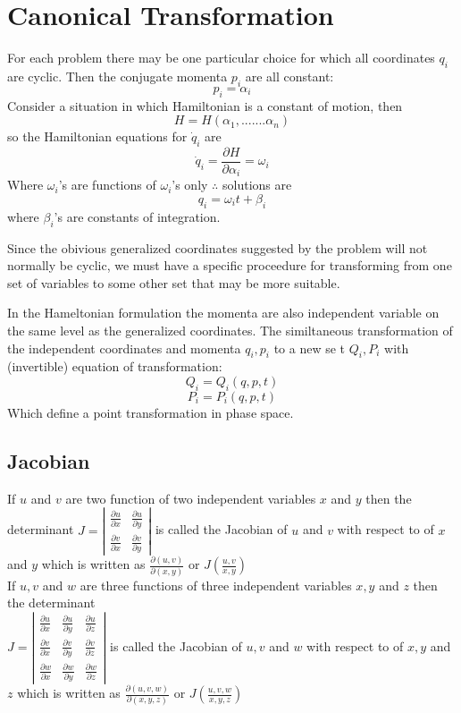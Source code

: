 \chapter{Canonical Transformation}
For each problem there may be one particular choice for which all coordinates $q_i$ are cyclic. Then the conjugate momenta $p_i$ are all constant:
$$p_i=\alpha_i$$
Consider a situation in which Hamiltonian is a constant of motion,
then 
$$H=H(\alpha_1,.......\alpha_n)$$
so the Hamiltonian equations for $\dot{q}_i$ are 
$$\dot{q}_i=\frac{\partial H}{\partial \alpha_i}=\omega_i$$
Where $\omega_i$'s are functions of $\omega_i$'s only 
$\therefore $ solutions are
$$ q_i=\omega_i t+\beta_i$$
where $\beta_i$'s are constants of integration.\\
\par Since the obivious generalized coordinates suggested by the problem will
not normally be cyclic, we must have a specific proceedure for transforming from one set of variables to some other set that may be more suitable.\\
\par In the Hameltonian formulation the momenta are also independent variable on the same level as the generalized coordinates. The similtaneous transformation of the independent coordinates and momenta $q_i,p_i$ to a new se t  $Q_i,P_i$ with (invertible) equation of transformation:
$$Q_i=Q_i (q,p,t)$$
$$P_i=P_i (q,p,t)$$
Which define a point transformation in phase space.
\section{Jacobian}
If $u$ and $v$ are two function of two independent variables $x$ and $y$ then the determinant $J=\left|\begin{array}{ll}\frac{\partial u}{\partial x} & \frac{\partial u}{\partial y} \\ \frac{\partial v}{\partial x} & \frac{\partial v}{\partial y}\end{array}\right|$ is called the Jacobian of $u$ and $v$ with respect to of $x$ and $y$ which is written as $\frac{\partial(u, v)}{\partial(x, y)}$ or $J\left(\frac{u, v}{x, y}\right)$\\
If $u, v$ and $w$ are three functions of three independent variables $x, y$ and $z$ then the determinant\\
$J=\left|\begin{array}{lll}\frac{\partial u}{\partial x} & \frac{\partial u}{\partial y} & \frac{\partial u}{\partial z} \\ \frac{\partial v}{\partial x} & \frac{\partial v}{\partial y} & \frac{\partial v}{\partial z} \\ \frac{\partial w}{\partial x} & \frac{\partial w}{\partial y} & \frac{\partial w}{\partial z}\end{array}\right|$
is called the Jacobian of $u, v$ and $w$ with respect to of $x, y$ and $z$
which is written as $\frac{\partial(u, v, w)}{\partial(x, y, z)}$ or $J\left(\frac{u, v, w}{x, y, z}\right)$
